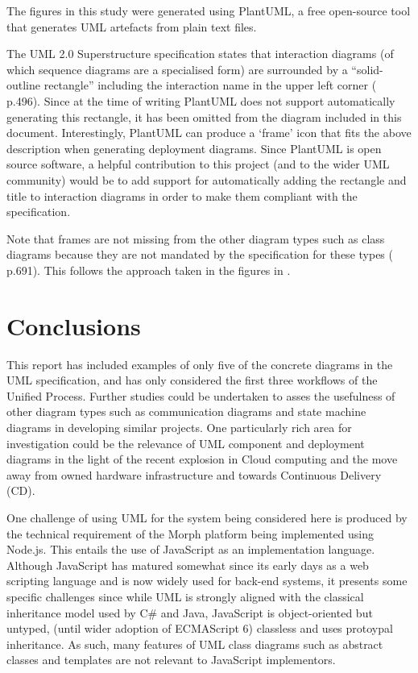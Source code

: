 \documentclass[runningheads,a4paper]{llncs}
\begin{document}
The figures in this study were generated using PlantUML, a free open-source tool\cite{plantuml} that generates UML artefacts from plain text files.

The UML 2.0 Superstructure specification states that interaction diagrams (of which sequence diagrams are a specialised form) are surrounded by a ``solid-outline rectangle'' including the interaction name in the upper left corner (\cite{omg2011} p.496). Since at the time of writing PlantUML does not support automatically generating this rectangle, it has been omitted from the diagram included in this document. Interestingly, PlantUML can produce a `frame' icon that fits the above description when generating deployment diagrams. Since PlantUML is open source software, a helpful contribution to this project (and to the wider UML community) would be to add support for automatically adding the rectangle and title to interaction diagrams in order to make them compliant with the specification.

Note that frames are not missing from the other diagram types such as class diagrams because they are not mandated by the specification for these types (\cite{omg2011} p.691). This follows the approach taken in the figures in \cite{arlow}.


\section{Conclusions}

This report has included examples of only five of the concrete diagrams in the UML specification, and has only considered the first three workflows of the Unified Process. Further studies could be undertaken to asses the usefulness of other diagram types such as communication diagrams and state machine diagrams in developing similar projects. One particularly rich area for investigation could be the relevance of UML component and deployment diagrams in the light of the recent explosion in Cloud computing and the move away from owned hardware infrastructure and towards Continuous Delivery (CD).

One challenge of using UML for the system being considered here is produced by the technical requirement of the Morph platform being implemented using Node.js. This entails the use of JavaScript as an implementation language. Although JavaScript has matured somewhat since its early days as a web scripting language and is now widely used for back-end systems, it presents some specific challenges since while UML is strongly aligned with the classical inheritance model used by C\# and Java, JavaScript is object-oriented but untyped, (until wider adoption of ECMAScript 6) classless and uses protoypal inheritance. As such, many features of UML class diagrams such as abstract classes and templates are not relevant to JavaScript implementors.
\end{document}
